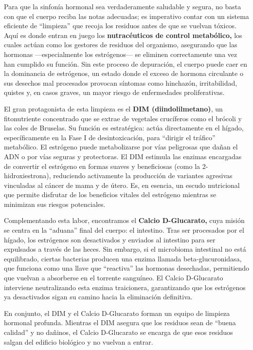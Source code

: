 \documentclass[
  spanish,
]{article}
\begin{document}
Para que la sinfonía hormonal sea verdaderamente saludable y segura, no basta con que el cuerpo reciba las notas adecuadas; es imperativo contar con un sistema eficiente de ``limpieza'' que recoja los residuos antes de que se vuelvan tóxicos. Aquí es donde entran en juego los \textbf{nutracéuticos de control metabólico,} los cuales actúan como los gestores de residuos del organismo, asegurando que las hormonas ---especialmente los estrógenos--- se eliminen correctamente una vez han cumplido su función. Sin este proceso de depuración, el cuerpo puede caer en la dominancia de estrógenos, un estado donde el exceso de hormona circulante o sus desechos mal procesados provocan síntomas como hinchazón, irritabilidad, quistes y, en casos graves, un mayor riesgo de enfermedades proliferativas.

El gran protagonista de esta limpieza es el \textbf{DIM (diindolilmetano)}, un fitonutriente concentrado que se extrae de vegetales crucíferos como el brócoli y las coles de Bruselas.
Su función es estratégica: actúa directamente en el hígado, específicamente en la Fase I de desintoxicación, para ``dirigir el tráfico'' metabólico. El estrógeno puede metabolizarse por vías peligrosas que dañan el ADN o por vías seguras y protectoras. El DIM estimula las enzimas encargadas de convertir el estrógeno en formas suaves y beneficiosas (como la 2-hidroxiestrona), reduciendo activamente la producción de variantes agresivas vinculadas al cáncer de mama y de útero. Es, en esencia, un escudo nutricional que permite disfrutar de los beneficios vitales del estrógeno mientras se minimizan sus riesgos potenciales.

Complementando esta labor, encontramos el \textbf{Calcio D-Glucarato,} cuya misión se centra en la ``aduana'' final del cuerpo: el intestino. Tras ser procesados por el hígado, los estrógenos son desactivados y enviados al intestino para ser expulsados a través de las heces. Sin embargo, si el microbioma intestinal no está equilibrado, ciertas bacterias producen una enzima llamada beta-glucuronidasa, que funciona como una llave que ``reactiva'' las hormonas desechadas, permitiendo que vuelvan a absorberse en el torrente sanguíneo. El Calcio D-Glucarato interviene neutralizando esta enzima traicionera, garantizando que los estrógenos ya desactivados sigan su camino hacia la eliminación definitiva.

En conjunto, el DIM y el Calcio D-Glucarato forman un equipo de limpieza hormonal profunda. Mientras el DIM asegura que los residuos sean de ``buena calidad'' y no dañinos, el Calcio D-Glucarato se encarga de que esos residuos salgan del edificio biológico y no vuelvan a entrar.
\end{document}
